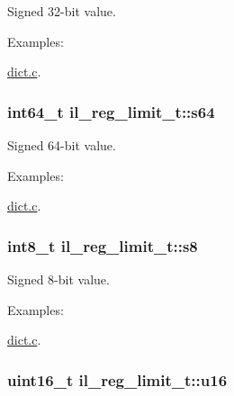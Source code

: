 Signed 32-\/bit value. 

\begin{Desc}
\item[Examples\+: ]\par
\hyperlink{dict_8c-example}{dict.\+c}.\end{Desc}
\subsubsection[{\texorpdfstring{s64}{s64}}]{\setlength{\rightskip}{0pt plus 5cm}int64\+\_\+t il\+\_\+reg\+\_\+limit\+\_\+t\+::s64}\hypertarget{unionil__reg__limit__t_afb38fc9250bd41f7da4d61a118941d65}{}\label{unionil__reg__limit__t_afb38fc9250bd41f7da4d61a118941d65}


Signed 64-\/bit value. 

\begin{Desc}
\item[Examples\+: ]\par
\hyperlink{dict_8c-example}{dict.\+c}.\end{Desc}
\subsubsection[{\texorpdfstring{s8}{s8}}]{\setlength{\rightskip}{0pt plus 5cm}int8\+\_\+t il\+\_\+reg\+\_\+limit\+\_\+t\+::s8}\hypertarget{unionil__reg__limit__t_a222839738af51772d82795ec5d625c9c}{}\label{unionil__reg__limit__t_a222839738af51772d82795ec5d625c9c}


Signed 8-\/bit value. 

\begin{Desc}
\item[Examples\+: ]\par
\hyperlink{dict_8c-example}{dict.\+c}.\end{Desc}
\subsubsection[{\texorpdfstring{u16}{u16}}]{\setlength{\rightskip}{0pt plus 5cm}uint16\+\_\+t il\+\_\+reg\+\_\+limit\+\_\+t\+::u16}\hypertarget{unionil__reg__limit__t_abdd4796158cab746b84f14e77192f2ec}{}\label{unionil__reg__limit__t_abdd4796158cab746b84f14e77192f2ec}



